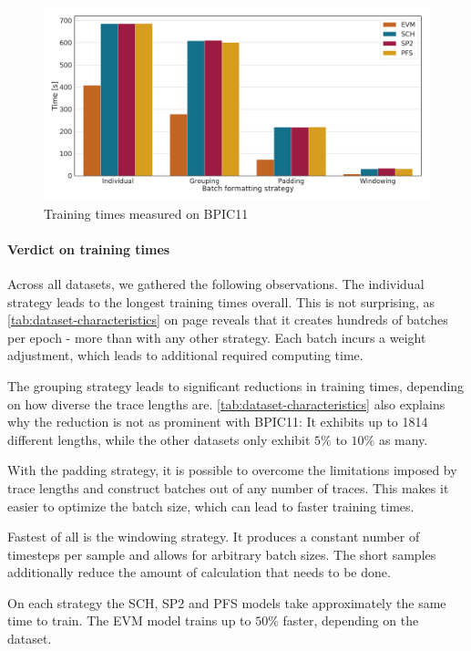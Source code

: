 \begin{figure}[!htb]
    \centering
    \includegraphics[width=\textwidth]{gfx/bpic2011/train_timings.pdf}
    \caption{Training times measured on BPIC11}
    \label{fig:BPIC11-training-timings}
\end{figure}

\paragraph{Verdict on training times}
Across all datasets, we gathered the following observations.
The individual strategy leads to the longest training times overall.
This is not surprising, as \autoref{tab:dataset-characteristics} on page \pageref{tab:dataset-characteristics} reveals that it creates hundreds of batches per epoch - more than with any other strategy.
Each batch incurs a weight adjustment, which leads to additional required computing time.

The grouping strategy leads to significant reductions in training times, depending on how diverse the trace lengths are. \autoref{tab:dataset-characteristics} also explains why the reduction is not as prominent with BPIC11: It exhibits up to 1814 different lengths, while the other datasets only exhibit $5\%$ to $10\%$ as many.

With the padding strategy, it is possible to overcome the limitations imposed by trace lengths and construct batches out of any number of traces. This makes it easier to optimize the batch size, which can lead to faster training times.

Fastest of all is the windowing strategy.
It produces a constant number of timesteps per sample and allows for arbitrary batch sizes.
The short samples additionally reduce the amount of calculation that needs to be done.

On each strategy the SCH, SP2 and PFS models take approximately the same time to train.
The EVM model trains up to $50\%$ faster, depending on the dataset.
\FloatBarrier

